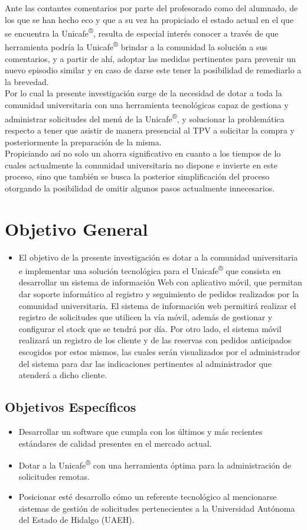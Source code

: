 \begin{large}
Ante las contantes comentarios por parte del profesorado como del alumnado, de los que se han hecho eco y que a su vez ha propiciado el estado actual en el que se encuentra la Unicafe\textsuperscript{®}, resulta de especial interés conocer a través de que herramienta podría la Unicafe\textsuperscript{®} brindar a la comunidad la solución a sus comentarios, y a partir de ahí, adoptar las medidas pertinentes para prevenir un nuevo episodio similar y en caso de darse este tener la posibilidad de remediarlo a la brevedad.
\\
Por lo cual la presente investigación surge de la necesidad de dotar a toda la comunidad universitaria con una herramienta tecnológicas capaz de gestiona y administrar solicitudes del menú de la Unicafe\textsuperscript{®}, y solucionar la problemática respecto a tener que asistir de manera presencial al TPV a solicitar la compra y posteriormente la preparación de la misma.
\\
Propiciando así no solo un ahorra significativo en cuanto a los tiempos de lo cuales actualmente la comunidad universitaria no dispone e invierte en este proceso, sino que también se busca la posterior simplificación del proceso otorgando la posibilidad de omitir algunos pasos actualmente innecesarios.

\section{Objetivo General}
\begin{itemize}
    \item El objetivo de la presente investigación es dotar a la comunidad universitaria e implementar una solución tecnológica para el Unicafe\textsuperscript{®} que consista en desarrollar un sistema de información Web con aplicativo móvil, que permitan dar soporte informático al registro y seguimiento de pedidos realizados por la comunidad universitaria. El sistema de información web permitirá realizar el registro de solicitudes que utilicen la vía móvil, además de gestionar y configurar el stock que se tendrá por día. Por otro lado, el sistema móvil realizará un registro de los cliente y de las reservas con pedidos anticipados escogidos por estos mismos, las cuales serán visualizados por el administrador del sistema para dar las indicaciones pertinentes al administrador que atenderá a dicho cliente.
\end{itemize}\leavevmode
\subsection{Objetivos Específicos}
\begin{itemize}
    \item Desarrollar un software que cumpla con los últimos y más recientes estándares de calidad presentes en el mercado actual. 
    \item Dotar a la Unicafe\textsuperscript{®} con una herramienta óptima para la administración de solicitudes remotas.
    \item Posicionar esté desarrollo cómo un referente tecnológico al mencionarse sistemas de gestión de solicitudes pertenecientes a la Universidad Autónoma del Estado de Hidalgo (UAEH).
\end{itemize}\leavevmode

\end{large}
